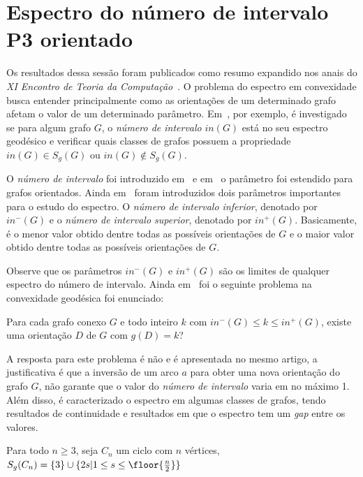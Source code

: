 \chapter{Espectro do número de intervalo P3 orientado}\label{4-espectro}

Os resultados dessa sessão foram publicados como resumo expandido nos anais do \emph{XI Encontro de Teoria da Computação}~\cite{ALVARO2026}. O problema do espectro em convexidade busca entender principalmente como as orientações de um determinado grafo afetam o valor de um determinado parâmetro. Em~\cite{Lu2007}, por exemplo, é investigado se para algum grafo $G$, o \emph{número de intervalo} $in(G)$ está no seu espectro geodésico e verificar quais classes de grafos possuem a propriedade $in(G) \in S_g(G)$ ou $in(G) \notin S_g(G)$.

O \emph{número de intervalo} foi introduzido em~\cite{HARARY199389} e em~\cite{CHARTRAND2000181} o parâmetro foi estendido para grafos orientados. Ainda em~\cite{CHARTRAND2000181} foram introduzidos dois parâmetros importantes para o estudo do espectro. O \emph{número de intervalo inferior}, denotado por $in^-(G)$ e o \emph{número de intervalo superior}, denotado por $in^+(G)$. Basicamente, é o menor valor obtido dentre todas as possíveis orientações de $G$ e o maior valor obtido dentre todas as possíveis orientações de $G$.

Observe que os parâmetros $in^-(G)$ e $in^+(G)$ são os limites de qualquer espectro do número de intervalo. Ainda em~\cite{HARARY199389} foi o seguinte problema na convexidade geodésica foi enunciado:

\begin{pro}
	Para cada grafo conexo $G$ e todo inteiro $k$ com $in^-(G) \leq k \leq in^+(G)$, existe uma orientação $D$ de $G$ com $g(D) = k$?
\end{pro}

A resposta para este problema é não e é apresentada no mesmo artigo, a justificativa é que a inversão de um arco $a$ para obter uma nova orientação do grafo $G$, não garante que o valor do \emph{número de intervalo} varia em no máximo 1. Além disso, é caracterizado o espectro em algumas classes de grafos, tendo resultados de continuidade e resultados em que o espectro tem um \emph{gap} entre os valores.

\begin{theorem}
	Para todo $n \geq 3$, seja $C_n$ um ciclo com $n$ vértices, $S_g(C_n) = \{3\} \cup \{2s \lvert 1 \leq s \leq \floor{\frac{n}{2}}\}$
\end{theorem}

